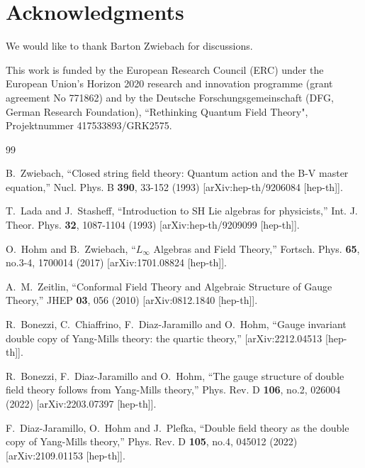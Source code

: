 \documentclass[12pt]{article}\pdfoutput=1
\begin{document}
\medskip

 \section*{Acknowledgments} 

We would like to thank Barton Zwiebach for discussions. 

\noindent
This work is funded   by the European Research Council (ERC) under the European Union's Horizon 2020 research and innovation programme (grant agreement No 771862)
and by the Deutsche Forschungsgemeinschaft (DFG, German Research Foundation), ``Rethinking Quantum Field Theory", Projektnummer 417533893/GRK2575.   





\begin{thebibliography}{99}

B.~Zwiebach,
``Closed string field theory: Quantum action and the B-V master equation,''
Nucl. Phys. B \textbf{390}, 33-152 (1993)
[arXiv:hep-th/9206084 [hep-th]].

T.~Lada and J.~Stasheff,
``Introduction to SH Lie algebras for physicists,''
Int. J. Theor. Phys. \textbf{32}, 1087-1104 (1993)
[arXiv:hep-th/9209099 [hep-th]].

O.~Hohm and B.~Zwiebach,
``$L_{\infty}$ Algebras and Field Theory,''
Fortsch. Phys. \textbf{65}, no.3-4, 1700014 (2017)
[arXiv:1701.08824 [hep-th]].

A.~M.~Zeitlin,
``Conformal Field Theory and Algebraic Structure of Gauge Theory,''
JHEP \textbf{03}, 056 (2010)
[arXiv:0812.1840 [hep-th]].



R.~Bonezzi, C.~Chiaffrino, F.~Diaz-Jaramillo and O.~Hohm,
``Gauge invariant double copy of Yang-Mills theory: the quartic theory,''
[arXiv:2212.04513 [hep-th]].

R.~Bonezzi, F.~Diaz-Jaramillo and O.~Hohm,
``The gauge structure of double field theory follows from Yang-Mills theory,''
Phys. Rev. D \textbf{106}, no.2, 026004 (2022)
[arXiv:2203.07397 [hep-th]].

F.~Diaz-Jaramillo, O.~Hohm and J.~Plefka,
``Double field theory as the double copy of Yang-Mills theory,''
Phys. Rev. D \textbf{105}, no.4, 045012 (2022)
[arXiv:2109.01153 [hep-th]].


\end{thebibliography}
\end{document}
